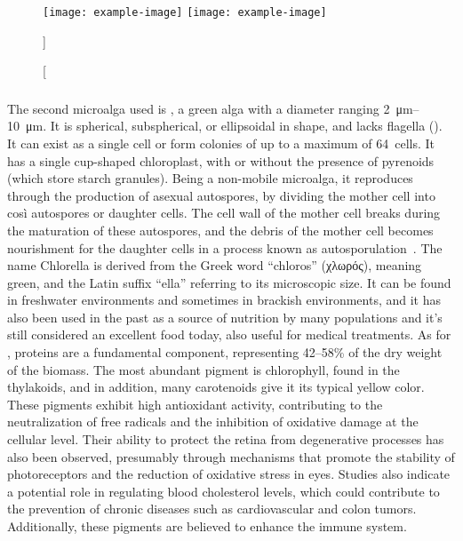 \begin{figure}[H]
\centering
		{\texttt{[image: example-image]}}%
\hfill
		{\texttt{[image: example-image]}}%
\caption%
[]%
{}
\label{fig:}
\end{figure}


\subsubsection{}
The second microalga used is , a green alga with a diameter ranging \qtyrange{2}{10}{\micro\metre}. It is spherical, subspherical, or ellipsoidal in shape, and lacks flagella (). It can exist as a single cell or form colonies of up to a maximum of \qty{64}{cells}. It has a single cup-shaped chloroplast, with or without the presence of pyrenoids (which store starch granules). Being a non-mobile microalga, it reproduces through the production of asexual autospores, by dividing the mother cell into  così autospores or daughter cells. The cell wall of the mother cell breaks during the maturation of these autospores, and the debris of the mother cell becomes nourishment for the daughter cells in a process known as autosporulation~\parencite{ru_Chlorella_2020}. The name Chlorella is derived from the Greek word “chloros” (χλωρός), meaning green, and the Latin suffix “ella” referring to its microscopic size. It can be found in freshwater environments and sometimes in brackish environments, and it has also been used in the past as a source of nutrition by many populations and it’s still considered an excellent food today, also useful for medical treatments. As for , proteins are a fundamental component, representing \numrange{42}{58}\%\zariv{} of the dry weight of the biomass. The most abundant pigment is chlorophyll, found in the thylakoids, and in addition, many carotenoids give it its typical yellow color. These pigments exhibit high antioxidant activity, contributing to the neutralization of free radicals and the inhibition of oxidative damage at the cellular level. Their ability to protect the retina from degenerative processes has also been observed, presumably through mechanisms that promote the stability of photoreceptors and the reduction of oxidative stress in eyes. Studies also indicate a potential role in regulating blood cholesterol levels, which could contribute to the prevention of chronic diseases such as cardiovascular and colon tumors. Additionally, these pigments are believed to enhance the immune system.

